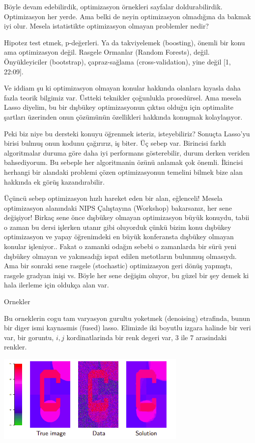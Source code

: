 \documentclass[12pt,fleqn]{article}\usepackage{../../common}
\begin{document}
Böyle devam edebilirdik, optimizasyon örnekleri sayfalar
doldurabilirdik. Optimizasyon her yerde. Ama belki de neyin optimizasyon
olmadığına da bakmak iyi olur. Mesela istatistikte optimizasyon olmayan
problemler nedir?

Hipotez test etmek, p-değerleri. Ya da takviyelemek (boosting), önemli bir
konu ama optimizasyon değil. Rasgele Ormanlar (Random Forests),
değil. Önyükleyiciler (bootstrap), çapraz-sağlama (cross-validation), yine
değil [1, 22:09].  

Ve iddiam şu ki optimizasyon olmayan konular hakkında olanlara kıyasla daha
fazla teorik bilgimiz var. Üstteki teknikler çoğunlukla prosedürsel. Ama
mesela Lasso diyelim, bu bir dışbükey optimizasyonun çıktısı olduğu için
optimalite şartları üzerinden onun çözümünün özellikleri hakkında konuşmak
kolaylaşıyor. 

Peki biz niye bu dersteki konuyu öğrenmek isteriz, isteyebiliriz? Sonuçta
Lasso'yu birisi bulmuş onun kodunu çağırırız, iş biter. Üç sebep
var. Birincisi farklı algoritmalar duruma göre daha iyi performans
gösterebilir, durum derken veriden bahsediyorum. Bu sebeple her
algoritmanin özünü anlamak çok önemli. İkincisi herhangi bir alandaki
problemi çözen optimizasyonun temelini bilmek bize alan hakkında ek görüş
kazandırabilir. 

Üçüncü sebep optimizasyon hızlı hareket eden bir alan, eğlenceli! Mesela
optimizasyon alanındaki NIPS Çalıştayına (Workshop) bakarsanız, her sene
değişiyor! Birkaç sene önce dışbükey olmayan optimizasyon büyük konuydu,
tabii o zaman bu dersi işlerken utanır gibi oluyorduk çünkü bizim konu
dışbükey optimizasyon ve yapay öğrenimdeki en büyük konferansta dışbükey
olmayan konular işleniyor.. Fakat o zamanki odağın sebebi o zamanlarda bir
sürü yeni dışbükey olmayan ve yakınsadığı ispat edilen metotların bulunmuş
olmasıydı. Ama bir sonraki sene rasgele (stochastic) optimizasyon geri
dönüş yapmıştı, rasgele gradyan inişi vs. Böyle her sene değişim oluyor, bu
güzel bir şey demek ki hala ilerleme için oldukça alan var.

Ornekler

Bu orneklerin cogu tam varyasyon gurultu yoketmek (denoising) etrafinda,
bunun bir diger ismi kaynasmis (fused) lasso. Elimizde iki boyutlu izgara
halinde bir veri var, bir goruntu, $i,j$ kordinatlarinda bir renk degeri
var, 3 ile 7 arasindaki renkler. 

\includegraphics[width=25em]{func_19_intro_01.png}
\end{document}
